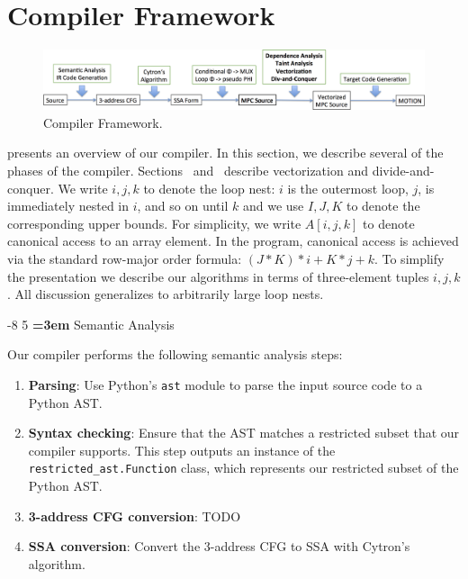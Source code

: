 \documentclass[sigconf, screen, natbib=false, dvipsnames, table]{acmart}
\makeatletter
\renewcommand{\subsection}{\@startsection{subsection}{2}{\z@}%
                        {-8\p@ \@plus -4\p@ \@minus -4\p@}%
                        {5\p@ \@plus 2\p@ \@minus 2\p@}%
                        {\normalfont\Large\bfseries\boldmath
                         \rightskip=\z@ \@plus 3em\pretolerance=10000 }}
\theoremstyle{definition}
\makeatother
\begin{document}
\section{\bf Compiler Framework}
\label{sec:preliminaries}

\begin{figure}
  \includegraphics[width=1.0\linewidth]{figs_paper_SIMD/compiler_framework.png}
  \caption{Compiler Framework.} 
  \label{fig:compiler_framework}
\end{figure}



 presents an overview of our compiler. In this section, we describe several of the phases of the compiler. 
Sections~ and~ describe vectorization and divide-and-conquer.
We write $i,j,k$ to denote the loop nest: $i$ is the outermost loop, $j$, is immediately nested in $i$, and so on until $k$
and we use $I,J,K$ to denote the corresponding upper bounds. For simplicity, we write $A[i,j,k]$ to denote canonical access 
to an array element. In the program, canonical access is achieved via the standard row-major order formula: $(J*K)*i + K*j + k$.
To simplify the presentation we describe our algorithms in terms of three-element tuples $i,j,k$.
All discussion generalizes to arbitrarily large loop nests.

\subsection{Semantic Analysis}

Our compiler performs the following semantic analysis steps:

\begin{enumerate}
  \item
        \textbf{Parsing}:
        Use Python's \texttt{ast} module to parse the input source code to a Python AST.
  \item
        \textbf{Syntax checking}:
        Ensure that the AST matches a restricted subset that our compiler supports.
        This step outputs an instance of the \texttt{restricted\_ast.Function} class, which represents our restricted subset of the Python AST.
  \item
        \textbf{3-address CFG conversion}: TODO
  \item
        \textbf{SSA conversion}:
        Convert the 3-address CFG to SSA with Cytron's algorithm.
\end{enumerate}
\end{document}
